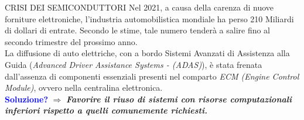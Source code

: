 {

\begin{frame}{CRISI DEI SEMICONDUTTORI}
    \renewcommand{\thefootnote}{\fnsymbol{footnote}}
    Nel 2021, a causa della carenza di nuove forniture elettroniche, l'industria 
    automobilistica mondiale ha perso 210 Miliardi di dollari di entrate\footnotemark[1].
    Secondo le stime, tale numero tenderà a salire fino al secondo trimestre 
    del prossimo anno.\\
    \vspace{0.3cm}
    La diffusione di auto elettriche, con a bordo Sistemi 
    Avanzati di Assistenza alla Guida (\emph{Advanced Driver Assistance Systems - 
    (ADAS)}), è stata frenata dall'assenza di componenti essenziali presenti nel comparto \emph{ECM (Engine Control Module)}, ovvero nella centralina elettronica.\\
    \vspace{0.3cm}
    \textcolor{blue}{{\bfseries{Soluzione?}}} $\Rightarrow$ {\bfseries{\emph{Favorire il riuso di sistemi con risorse computazionali inferiori rispetto a quelli comunemente richiesti.}}}
\end{frame}

}

